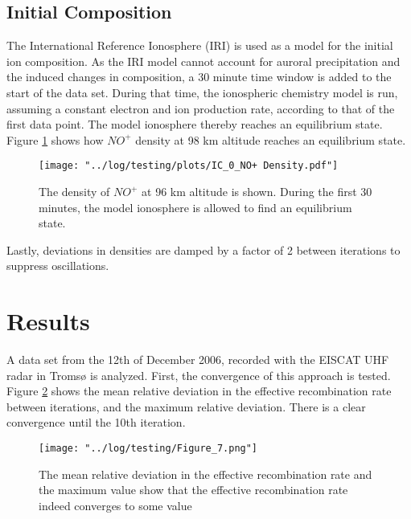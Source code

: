 \documentclass[10pt, a4paper]{article}
\numberwithin{equation}{section}										%
\begin{document}
\subsection{Initial Composition}
The International Reference Ionosphere (IRI) \cite{bilitza_international_2014} is used as a model for the initial ion composition. As the IRI model cannot account for auroral precipitation and the induced changes in composition, a 30 minute time window is added to the start of the data set. During that time, the ionospheric chemistry model is run, assuming a constant electron and ion production rate, according to that of the first data point. The model ionosphere thereby reaches an equilibrium state. Figure \ref{fig:dialin} shows how $NO^+$ density at 98 km altitude reaches an equilibrium state.


\begin{figure}
	\centering
	\texttt{[image: "../log/testing/plots/IC\_0\_NO+ Density.pdf"]}
	\caption{The density of $NO^+$ at 96 km altitude is shown. During the first 30 minutes, the model ionosphere is allowed to find an equilibrium state.}
	\label{fig:dialin}
\end{figure}
%

Lastly, deviations in densities are damped by a factor of 2 between iterations to suppress oscillations.


\section{Results}
A data set from the 12th of December 2006, recorded with the EISCAT UHF radar in Tromsø is analyzed. First, the convergence of this approach is tested. Figure \ref{fig:convergence} shows the mean relative deviation in the effective recombination rate between iterations, and the maximum relative deviation. There is a clear convergence until the 10th iteration. 

\begin{figure}
	\centering
	\texttt{[image: "../log/testing/Figure\_7.png"]}
	\caption{The mean relative deviation in the effective recombination rate and the maximum value show that the effective recombination rate indeed converges to some value}
	\label{fig:convergence}
\end{figure}
%
\par\medskip
%
\end{document}
